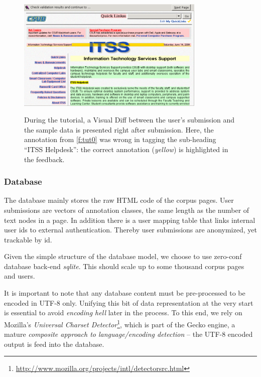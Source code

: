 \begin{figure}
	{\includegraphics[width=0.8\textwidth]{tut1}}
\caption{\label{f:tut1}During the tutorial, a Visual Diff between the user's submission and the sample data is presented right after submission.
	Here, the annotation from \ref{f:tut0} was wrong in tagging the sub-heading ``ITSS Helpdesk'': the correct annotation (\textit{yellow}) is highlighted in the feedback.}
\end{figure}

\subsubsection{Database}

The database mainly stores the raw HTML code of the corpus pages.
User submissions are vectors of annotation classes, the same length as the number of text nodes in a page.
In addition there is a user mapping table that links internal user ids to external authentication.
Thereby user submissions are anonymized, yet trackable by id.

Given the simple structure of the database model, we choose to use zero-conf database back-end \textit{sqlite}.
This should scale up to some thousand corpus pages and users.

It is important to note that any database content must be pre-processed to be encoded in UTF-8 only.
Unifying this bit of data representation at the very start is essential to avoid \textit{encoding hell} later in the process.
To this end, we rely on Mozilla's \emph{Universal Charset Detector}\footnote{\url{http://www.mozilla.org/projects/intl/detectorsrc.html}},
which is part of the Gecko engine, a mature \emph{composite approach to language/encoding detection} \cite{LiMomoi2001} 
-- the UTF-8 encoded output is feed into the database.
